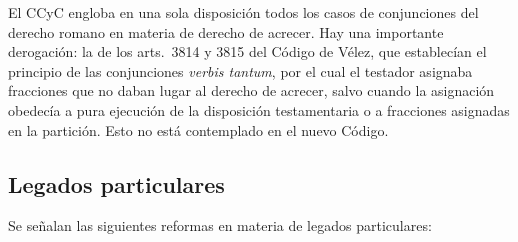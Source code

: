 \documentclass[12pt,oneside]{book}
\begin{document}
El CCyC engloba en una sola disposición todos los casos de conjunciones del derecho romano en materia de derecho de acrecer. Hay una importante derogación: la de los arts.~3814 y 3815 del Código de Vélez, que establecían el principio de las conjunciones \emph{verbis tantum}, por el cual el testador asignaba fracciones que no daban lugar al derecho de acrecer, salvo cuando la asignación obedecía a pura ejecución de la disposición testamentaria o a fracciones asignadas en la partición. Esto no está contemplado en el nuevo Código.

\subsection{Legados particulares}

Se señalan las siguientes reformas en materia de legados particulares:
\end{document}
